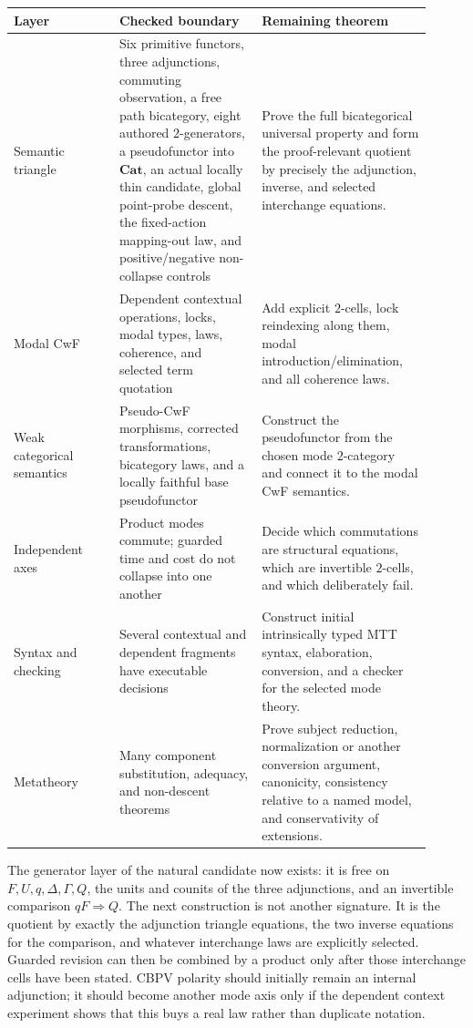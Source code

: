 \documentclass[11pt]{article}
\theoremstyle{definition}
\theoremstyle{remark}
\begin{document}
\begin{longtable}{>{\raggedright\arraybackslash}p{0.23\linewidth}%
                  >{\raggedright\arraybackslash}p{0.31\linewidth}%
                  >{\raggedright\arraybackslash}p{0.37\linewidth}}
\toprule
Layer & Checked boundary & Remaining theorem \\
\midrule
\endhead
Semantic triangle & Six primitive functors, three adjunctions, commuting
  observation, a free path bicategory, eight authored $2$-generators, a
  pseudofunctor into $\mathbf{Cat}$, an actual locally thin candidate, global
  point-probe descent, the fixed-action mapping-out law, and positive/negative
  non-collapse controls & Prove the full bicategorical universal property and
  form the proof-relevant quotient by precisely the adjunction, inverse, and
  selected interchange equations. \\
Modal CwF & Dependent contextual operations, locks, modal types, laws,
  coherence, and selected term quotation & Add explicit $2$-cells, lock
  reindexing along them, modal introduction/elimination, and all coherence laws. \\
Weak categorical semantics & Pseudo-CwF morphisms, corrected transformations,
  bicategory laws, and a locally faithful base pseudofunctor & Construct the
  pseudofunctor from the chosen mode $2$-category and connect it to the modal
  CwF semantics. \\
Independent axes & Product modes commute; guarded time and cost do not collapse
  into one another & Decide which commutations are structural equations, which
  are invertible $2$-cells, and which deliberately fail. \\
Syntax and checking & Several contextual and dependent fragments have executable
  decisions & Construct initial intrinsically typed MTT syntax, elaboration,
  conversion, and a checker for the selected mode theory. \\
Metatheory & Many component substitution, adequacy, and non-descent theorems &
  Prove subject reduction, normalization or another conversion argument,
  canonicity, consistency relative to a named model, and conservativity of
  extensions. \\
\bottomrule
\end{longtable}

The generator layer of the natural candidate now exists: it is free on
$F,U,q,\Delta,\Gamma,Q$, the units and counits of the three adjunctions, and an
invertible comparison $qF\Rightarrow Q$.  The next construction is not another
signature.  It is the quotient by exactly the adjunction triangle equations,
the two inverse equations for the comparison, and whatever interchange laws are
explicitly selected.  Guarded revision can then be combined by a product only
after those interchange cells have been stated.  CBPV polarity should initially
remain an internal adjunction; it should become another mode axis only if the
dependent context experiment shows that this buys a real law rather than
duplicate notation.
\end{document}
